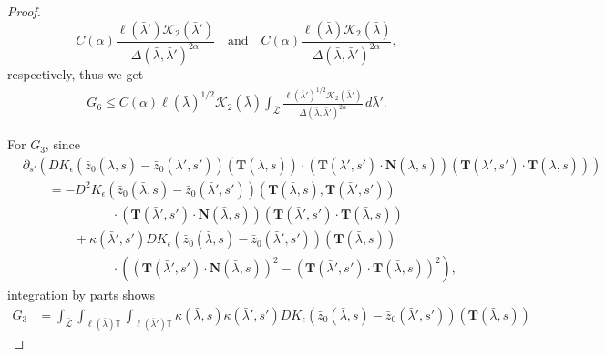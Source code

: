 \documentclass[reqno,centertags,12pt]{amsart}
\theoremstyle{definition}
\numberwithin{equation}{section}
\newcommand{\bbT}{{\mathbb{T}}}
\begin{document}
\begin{proof}
    \[
        C(\alpha)\frac{\ell(\bar{\lambda}')\mathcal{K}_{2}(\bar{\lambda}')}
        {\Delta(\bar{\lambda},\bar{\lambda}')^{2\alpha}}
        \quad\textrm{and}\quad
        C(\alpha)\frac{\ell(\bar{\lambda})\mathcal{K}_{2}(\bar{\lambda})}
        {\Delta(\bar{\lambda},\bar{\lambda}')^{2\alpha}},
    \]
    respectively, thus we get
    \begin{align*}
        G_{6} \leq C(\alpha)
        \ell(\bar{\lambda})^{1/2}\mathcal{K}_{2}(\bar{\lambda})
        \int_{\bar{\mathcal{L}}}
        \frac{\ell(\bar{\lambda}')^{1/2}\mathcal{K}_{2}(\bar{\lambda}')}
        {\Delta(\bar{\lambda},\bar{\lambda}')^{2\alpha}}
        \,d\bar{\lambda}'.
    \end{align*}

    For $G_{3}$, since
    \begin{align*}
        &\partial_{s'}
        \left(
            DK_{\epsilon}(\bar{z}_{0}(\bar{\lambda},s) - \bar{z}_{0}(\bar{\lambda}',s'))
            (\mathbf{T}(\bar{\lambda},s))
            \cdot(\mathbf{T}(\bar{\lambda}',s')\cdot\mathbf{N}(\bar{\lambda},s))
            (\mathbf{T}(\bar{\lambda}',s')\cdot\mathbf{T}(\bar{\lambda},s))
        \right)
        \\&\quad\quad
        = -D^{2}K_{\epsilon}(\bar{z}_{0}(\bar{\lambda},s) - \bar{z}_{0}(\bar{\lambda}',s'))
        (\mathbf{T}(\bar{\lambda},s),\mathbf{T}(\bar{\lambda}',s'))
        \\&\quad\quad\quad\quad\quad\quad\quad
        \cdot(\mathbf{T}(\bar{\lambda}',s')\cdot\mathbf{N}(\bar{\lambda},s))
        (\mathbf{T}(\bar{\lambda}',s')\cdot\mathbf{T}(\bar{\lambda},s))
        \\&\quad\quad\quad\quad
        +\kappa(\bar{\lambda}',s')
        DK_{\epsilon}(\bar{z}_{0}(\bar{\lambda},s) - \bar{z}_{0}(\bar{\lambda}',s'))
        (\mathbf{T}(\bar{\lambda},s))
        \\&\quad\quad\quad\quad\quad\quad\quad
        \cdot
        \left(
            (\mathbf{T}(\bar{\lambda}',s')\cdot\mathbf{N}(\bar{\lambda},s))^{2}
            - (\mathbf{T}(\bar{\lambda}',s')\cdot\mathbf{T}(\bar{\lambda},s))^{2}
        \right),
    \end{align*}
    integration by parts shows
    \begin{align*}
        G_{3} &= \int_{\bar{\mathcal{L}}}
        \int_{\ell(\bar{\lambda})\bbT}\int_{\ell(\bar{\lambda}')\bbT}
        \kappa(\bar{\lambda},s)\kappa(\bar{\lambda}',s')
        DK_{\epsilon}(\bar{z}_{0}(\bar{\lambda},s) - \bar{z}_{0}(\bar{\lambda}',s'))
        (\mathbf{T}(\bar{\lambda},s))

\end{align*}
\end{proof}
\end{document}
